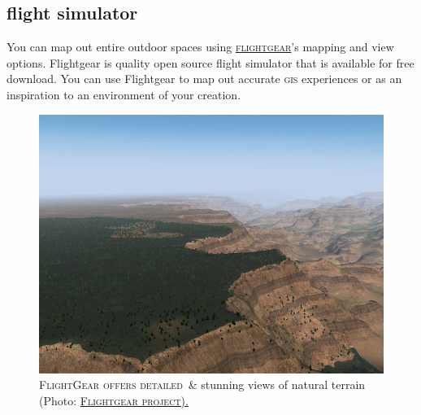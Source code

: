 \subsection{flight simulator}
You can map out entire outdoor spaces using
\href{http://home.flightgear.org/}{\textsc{flightgear}}'s mapping and view
options. Flightgear is quality open source flight simulator that is available
for free download. You can use Flightgear to map out accurate \textsc{gis}
experiences or as an inspiration to an environment of your creation.
\begin{figure}[h]                                                           
 \includegraphics[width=\linewidth]{./media/images/fg_scenery}%
  \small{\textsc{\\ FlightGear offers detailed }\,\& stunning views of natural
    terrain (Photo:
    \href{http://www.flightgear.org/wp-content/uploads/2014/09/dds-regional-ALS.jpg}{\textsc{Flightgear
        project).}}}
  \label{fig:fg_scenery}%
\end{figure}                                                                
